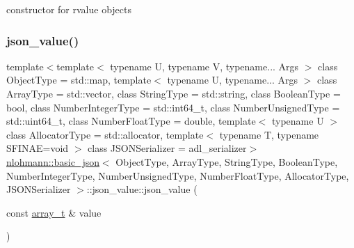 constructor for rvalue objects 

\mbox{\label{unionnlohmann_1_1basic__json_1_1json__value_a23a4858ed8fc824e5544edaf8a01a974}} 
\subsubsection{\texorpdfstring{json\_value()}{json\_value()}\hspace{0.1cm}{\footnotesize\ttfamily [11/12]}}
{\footnotesize\ttfamily template$<$template$<$ typename U, typename V, typename... Args $>$ class Object\+Type = std\+::map, template$<$ typename U, typename... Args $>$ class Array\+Type = std\+::vector, class String\+Type  = std\+::string, class Boolean\+Type  = bool, class Number\+Integer\+Type  = std\+::int64\+\_\+t, class Number\+Unsigned\+Type  = std\+::uint64\+\_\+t, class Number\+Float\+Type  = double, template$<$ typename U $>$ class Allocator\+Type = std\+::allocator, template$<$ typename T, typename S\+F\+I\+N\+A\+E=void $>$ class J\+S\+O\+N\+Serializer = adl\+\_\+serializer$>$ \\
\mbox{\hyperlink{classnlohmann_1_1basic__json}{nlohmann\+::basic\+\_\+json}}$<$ Object\+Type, Array\+Type, String\+Type, Boolean\+Type, Number\+Integer\+Type, Number\+Unsigned\+Type, Number\+Float\+Type, Allocator\+Type, J\+S\+O\+N\+Serializer $>$\+::json\+\_\+value\+::json\+\_\+value (\begin{DoxyParamCaption}\item[{const \mbox{\hyperlink{classnlohmann_1_1basic__json_ae095578e03df97c5b3991787f1056374}{array\+\_\+t}} \&}]{value }\end{DoxyParamCaption})\hspace{0.3cm}{\ttfamily [inline]}}



